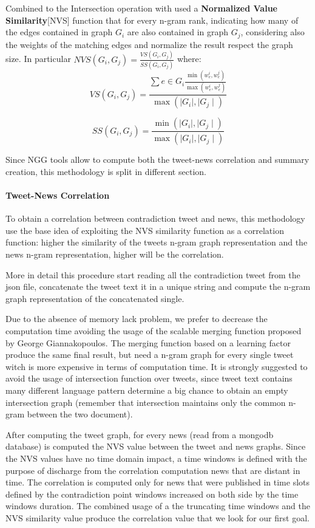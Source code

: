 Combined to the Intersection operation with used a \textbf{Normalized Value Similarity}[NVS] function that for every n-gram rank, indicating how many of the edges contained in graph $G_i$ are also contained in graph $G_j$, considering also the weights of the matching edges and normalize the result respect the graph size. In particular $NVS(G_i,G_j) = \frac{VS(G_i,G_j)}{SS(G_i,G_j)}$ where:
\begin{equation}
 VS(G_i,G_j)=\frac{\sum e \in G_i \frac{\min(w_e^i, w_e^j)}{\max(w_e^i, w_e^j)}}{\max(\mid G_i \mid, \mid G_j \mid)}
\end{equation}

\begin{equation}
 SS(G_i,G_j)=\frac{\min(\mid G_i \mid, \mid G_j \mid)}{\max(\mid G_i \mid, \mid G_j \mid)}
\end{equation}

Since NGG tools allow to compute both the tweet-news correlation and summary creation, this methodology is split in different section.
\paragraph{Tweet-News Correlation}
To obtain a correlation between contradiction tweet and news, this methodology use the base idea of exploiting the NVS similarity function as a correlation function: higher the similarity of the tweets n-gram graph representation and the news n-gram representation, higher will be the correlation.

More in detail this procedure start reading all the contradiction tweet from the json file, concatenate the tweet text it in a unique string and compute the n-gram graph representation of the concatenated single. 

Due to the absence of memory lack problem, we prefer to decrease the computation time avoiding the usage of the scalable merging function proposed by George Giannakopoulos. The merging function based on a learning factor produce the same final result, but need a n-gram graph for every single tweet witch is more expensive in terms of computation time. It is strongly suggested to avoid the usage of intersection function over tweets, since tweet text contains many different language pattern determine a big chance to obtain an empty intersection graph (remember that intersection maintains only the common n-gram between the two document).

After computing the tweet graph, for every news (read from a mongodb database) is computed the NVS value between the tweet and news graphs. Since the NVS values have no time domain impact, a time windows is defined with the purpose of discharge from the correlation computation news that are distant in time. The correlation is computed only for news that were published in time slots defined by the contradiction point windows increased on both side by the time windows duration. The combined usage of a the truncating time windows  and the NVS similarity value produce the correlation value that we look for our first goal.
